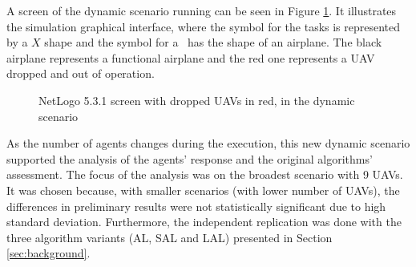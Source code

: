 A screen of the dynamic scenario running can be seen in Figure \ref{fig:screen01}. It illustrates the simulation graphical interface, where the symbol for the tasks is represented by a $X$ shape and the symbol for a \uav\ has the shape of an airplane. The black airplane represents a functional airplane and the red one represents a UAV dropped and out of operation.

\begin{figure}[h!]
	\begin{center}
		\caption{NetLogo 5.3.1 screen with dropped UAVs in red, in the dynamic scenario}
		\label{fig:screen01}
	\end{center}
\end{figure}

As the number of agents changes during the execution, this new dynamic scenario supported the analysis of the agents' response and the original algorithms' assessment. The focus of the analysis was on the broadest scenario with 9 UAVs. It was chosen because, with smaller scenarios (with lower number of UAVs), the differences in preliminary results were not statistically significant due to high standard deviation. Furthermore, the independent replication was done with the three algorithm variants (AL, SAL and LAL) presented in Section \ref{sec:background}.

